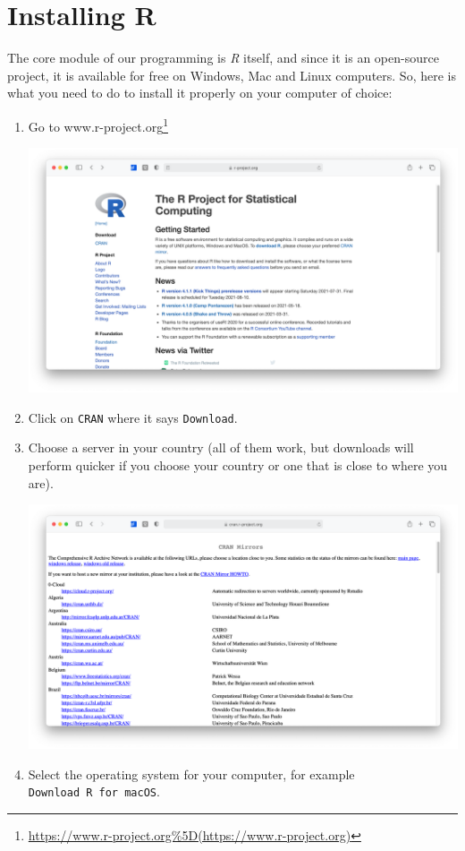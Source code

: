 \documentclass[
  letterpaper,
]{krantz}
\renewcommand{\href}[2]{#2\footnote{\url{#1}}}
\begin{document}
\section{Installing R}\label{installing-r}

The core module of our programming is \emph{R} itself, and since it is
an open-source project, it is available for free on Windows, Mac and
Linux computers. So, here is what you need to do to install it properly
on your computer of choice:

\begin{enumerate}
\def\labelenumi{\arabic{enumi}.}
\item
  Go to
  \href{https://www.r-project.org\%5D(https://www.r-project.org)}{www.r-project.org}

  \includegraphics{images/chapter_03_img/r_project/00_r_project_page.png}
\item
  Click on \texttt{CRAN} where it says \texttt{Download}.
\item
  Choose a server in your country (all of them work, but downloads will
  perform quicker if you choose your country or one that is close to
  where you are).

  \includegraphics{images/chapter_03_img/r_project/01_r_project_cran_mirror.png}
\item
  Select the operating system for your computer, for example
  \texttt{Download\ R\ for\ macOS}.


\end{enumerate}
\end{document}
